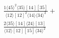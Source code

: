 \documentclass[varwidth, border=5pt]{standalone}
\begin{document}
\begin{my}
$\begin{gathered}
\scriptscriptstyle\frac{1⟨45⟩^2⟨35⟩[14][35]}{⟨12⟩[12]^2⟨14⟩⟨34⟩^2}+\\
\scriptscriptstyle\frac{2⟨35⟩[14]⟨24⟩[13]}{⟨12⟩[12][15]⟨34⟩^2}\phantom{+}
\end{gathered}$
\end{my}
\end{document}
